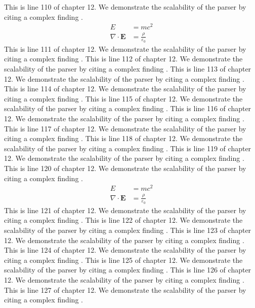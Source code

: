 This is line 110 of chapter 12. We demonstrate the scalability of the parser by citing a complex finding \cite{ref12_110}.
\begin{align*}
  E &= mc^2 \\
  \nabla \cdot \mathbf{E} &= \frac{\rho}{\varepsilon_0}
\end{align*}
This is line 111 of chapter 12. We demonstrate the scalability of the parser by citing a complex finding \cite{ref12_111}.
This is line 112 of chapter 12. We demonstrate the scalability of the parser by citing a complex finding \cite{ref12_112}.
This is line 113 of chapter 12. We demonstrate the scalability of the parser by citing a complex finding \cite{ref12_113}.
This is line 114 of chapter 12. We demonstrate the scalability of the parser by citing a complex finding \cite{ref12_114}.
This is line 115 of chapter 12. We demonstrate the scalability of the parser by citing a complex finding \cite{ref12_115}.
This is line 116 of chapter 12. We demonstrate the scalability of the parser by citing a complex finding \cite{ref12_116}.
This is line 117 of chapter 12. We demonstrate the scalability of the parser by citing a complex finding \cite{ref12_117}.
This is line 118 of chapter 12. We demonstrate the scalability of the parser by citing a complex finding \cite{ref12_118}.
This is line 119 of chapter 12. We demonstrate the scalability of the parser by citing a complex finding \cite{ref12_119}.
This is line 120 of chapter 12. We demonstrate the scalability of the parser by citing a complex finding \cite{ref12_120}.
\begin{align*}
  E &= mc^2 \\
  \nabla \cdot \mathbf{E} &= \frac{\rho}{\varepsilon_0}
\end{align*}
This is line 121 of chapter 12. We demonstrate the scalability of the parser by citing a complex finding \cite{ref12_121}.
This is line 122 of chapter 12. We demonstrate the scalability of the parser by citing a complex finding \cite{ref12_122}.
This is line 123 of chapter 12. We demonstrate the scalability of the parser by citing a complex finding \cite{ref12_123}.
This is line 124 of chapter 12. We demonstrate the scalability of the parser by citing a complex finding \cite{ref12_124}.
This is line 125 of chapter 12. We demonstrate the scalability of the parser by citing a complex finding \cite{ref12_125}.
This is line 126 of chapter 12. We demonstrate the scalability of the parser by citing a complex finding \cite{ref12_126}.
This is line 127 of chapter 12. We demonstrate the scalability of the parser by citing a complex finding \cite{ref12_127}.
